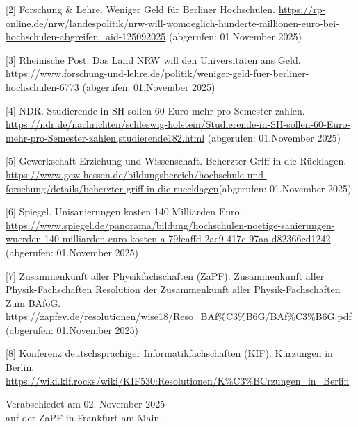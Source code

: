 \documentclass[DIV=calc]{scrartcl}
\let\oldgrqq=\grqq
\def\grqq{\oldgrqq\xspace}
\begin{document}
[2] Forschung \& Lehre. \glqq Weniger Geld für Berliner Hochschulen. \grqq \url{https://rp-online.de/nrw/landespolitik/nrw-will-womoeglich-hunderte-millionen-euro-bei-hochschulen-abgreifen_aid-125092025} (abgerufen: 01.November 2025)

[3] Rheinische Post. \glqq Das Land NRW will den Universitäten ans Geld. \grqq \url{https://www.forschung-und-lehre.de/politik/weniger-geld-fuer-berliner-hochschulen-6773} (abgerufen: 01.November 2025)

[4] NDR. \glqq Studierende in SH sollen 60 Euro mehr pro Semester zahlen. \grqq \url{https://ndr.de/nachrichten/schleswig-holstein/Studierende-in-SH-sollen-60-Euro-mehr-pro-Semester-zahlen,studierende182.html} (abgerufen: 01.November 2025)

[5] Gewerkschaft Erziehung und Wissenschaft. \glqq Beherzter Griff in die Rücklagen. \grqq \url{https://www.gew-hessen.de/bildungsbereich/hochschule-und-forschung/details/beherzter-griff-in-die-ruecklagen}(abgerufen: 01.November 2025)

[6] Spiegel. \glqq Unisanierungen kosten 140 Milliarden Euro. \grqq\url{https://www.spiegel.de/panorama/bildung/hochschulen-noetige-sanierungen-wuerden-140-milliarden-euro-kosten-a-79feaffd-2ac9-417c-97aa-d82366cd1242} (abgerufen: 01.November 2025)

[7] Zusammenkunft aller Physikfachschaften (ZaPF). \glqq Zusammenkunft aller
Physik-Fachschaften
Resolution der Zusammenkunft aller
Physik-Fachschaften
Zum BAföG. \grqq \url{https://zapfev.de/resolutionen/wise18/Reso_BAf%C3%B6G/BAf%C3%B6G.pdf} (abgerufen: 01.November 2025)

[8] Konferenz deutschsprachiger Informatikfachschaften (KIF). \glqq Kürzungen in Berlin. \grqq \url{https://wiki.kif.rocks/wiki/KIF530:Resolutionen/K%C3%BCrzungen_in_Berlin}


%
\vfill
\begin{flushright}
	Verabschiedet am 02. November 2025 \\
	auf der ZaPF in Frankfurt am Main.
\end{flushright}
\end{document}
